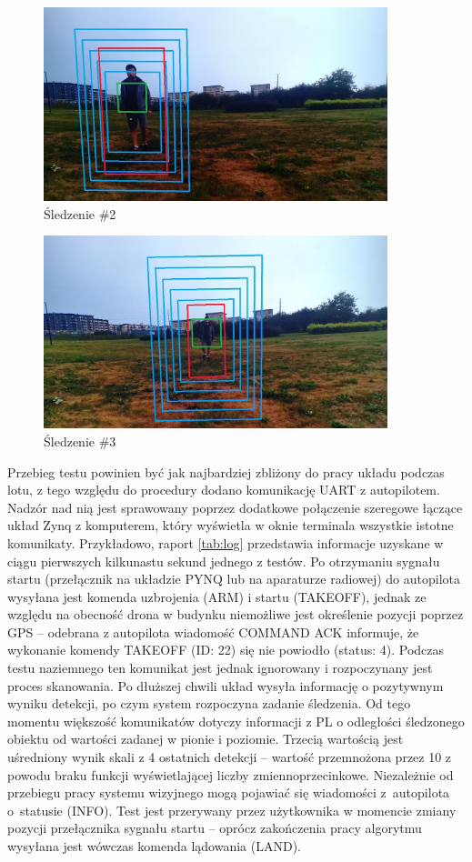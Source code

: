 \begin{figure}[h]
	\centering
	\includegraphics[width=10cm]{6_track_2.jpg}
	\caption{Śledzenie \#2}
	\label{fig:track_1}
\end{figure}

\begin{figure}[h]
	\centering
	\includegraphics[width=10cm]{6_track_3.jpg}
	\caption{Śledzenie \#3}
	\label{fig:track_1}
\end{figure}

Przebieg testu powinien być jak najbardziej zbliżony do pracy układu podczas lotu, z tego względu do procedury dodano komunikację UART z autopilotem. 
Nadzór nad nią jest sprawowany poprzez dodatkowe połączenie szeregowe łączące układ Zynq z komputerem, który wyświetla w oknie terminala wszystkie istotne komunikaty. 
Przykładowo, raport \ref{tab:log} przedstawia informacje uzyskane w ciągu pierwszych kilkunastu sekund jednego z testów. 
Po otrzymaniu sygnału startu (przełącznik na układzie PYNQ lub na aparaturze radiowej) do autopilota wysyłana jest komenda uzbrojenia (ARM) i startu (TAKEOFF), jednak ze względu na obecność drona w budynku niemożliwe jest określenie pozycji poprzez GPS -- odebrana z autopilota wiadomość COMMAND ACK informuje, że wykonanie komendy TAKEOFF (ID: 22) się nie powiodło (status: 4). 
Podczas testu naziemnego ten komunikat jest jednak ignorowany i rozpoczynany jest proces skanowania. 
Po dłuższej chwili układ wysyła informację o pozytywnym wyniku detekcji, po czym system rozpoczyna zadanie śledzenia. 
Od tego momentu większość komunikatów dotyczy informacji z PL o odległości śledzonego obiektu od wartości zadanej w pionie i poziomie. 
Trzecią wartością jest uśredniony wynik skali z 4 ostatnich detekcji -- wartość przemnożona przez 10 z powodu braku funkcji wyświetlającej liczby zmiennoprzecinkowe. 
Niezależnie od przebiegu pracy systemu wizyjnego mogą pojawiać się wiadomości z~autopilota o~statusie (INFO). 
Test jest przerywany przez użytkownika w momencie zmiany pozycji przełącznika sygnału startu -- oprócz zakończenia pracy algorytmu wysyłana jest wówczas komenda lądowania (LAND).


